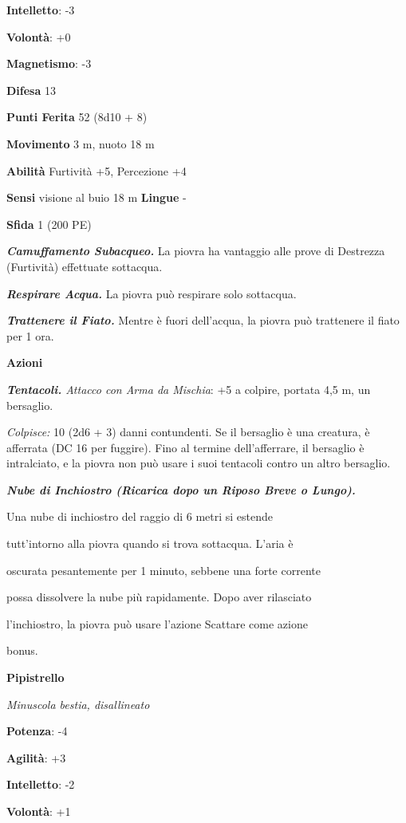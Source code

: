 \begin{multicols}{2}
\textbf{Intelletto}: -3

\textbf{Volontà}: +0

\textbf{Magnetismo}: -3

\textbf{Difesa} 13

\textbf{Punti Ferita} 52 (8d10 + 8)

\textbf{Movimento} 3 m, nuoto 18 m

\textbf{Abilità} Furtività +5, Percezione +4

\textbf{Sensi} visione al buio 18 m
\textbf{Lingue} -

\textbf{Sfida} 1 (200 PE)

\emph{\textbf{Camuffamento Subacqueo.}} La piovra ha vantaggio alle
prove di Destrezza (Furtività) effettuate sottacqua.

\emph{\textbf{Respirare Acqua.}} La piovra può respirare solo sottacqua.

\emph{\textbf{Trattenere il Fiato.}} Mentre è fuori dell'acqua, la
piovra può trattenere il fiato per 1 ora.

\textbf{Azioni}

\emph{\textbf{Tentacoli.} Attacco con Arma da Mischia}: +5 a colpire,
portata 4,5 m, un bersaglio.

\emph{Colpisce:} 10 (2d6 + 3) danni contundenti. Se il bersaglio è una
creatura, è afferrata (DC 16 per fuggire). Fino al termine
dell'afferrare, il bersaglio è intralciato, e la piovra non può usare i
suoi tentacoli contro un altro bersaglio.

\emph{\textbf{Nube di Inchiostro (Ricarica dopo un Riposo Breve o
Lungo).}}

Una nube di inchiostro del raggio di 6 metri si estende

tutt'intorno alla piovra quando si trova sottacqua. L'aria è

oscurata pesantemente per 1 minuto, sebbene una forte corrente

possa dissolvere la nube più rapidamente. Dopo aver rilasciato

l'inchiostro, la piovra può usare l'azione Scattare come azione

bonus.

\textbf{Pipistrello}

\emph{Minuscola bestia, disallineato}

\textbf{Potenza}: -4

\textbf{Agilità}: +3

\textbf{Intelletto}: -2

\textbf{Volontà}: +1


\end{multicols}
